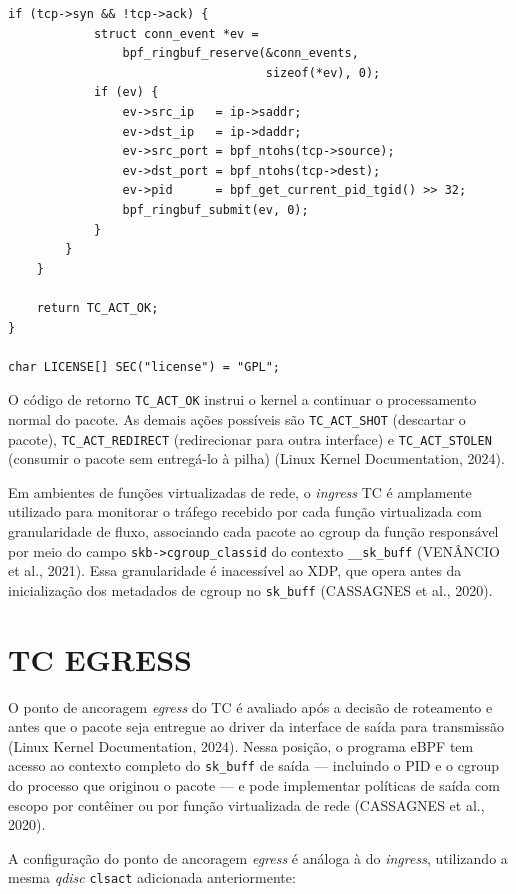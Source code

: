 \begin{lstlisting}[caption={Programa TC ingress que monitora bytes e novas conexões TCP.}, label=lst:tc-ingress-prog]
        if (tcp->syn && !tcp->ack) {
            struct conn_event *ev =
                bpf_ringbuf_reserve(&conn_events,
                                    sizeof(*ev), 0);
            if (ev) {
                ev->src_ip   = ip->saddr;
                ev->dst_ip   = ip->daddr;
                ev->src_port = bpf_ntohs(tcp->source);
                ev->dst_port = bpf_ntohs(tcp->dest);
                ev->pid      = bpf_get_current_pid_tgid() >> 32;
                bpf_ringbuf_submit(ev, 0);
            }
        }
    }

    return TC_ACT_OK;
}

char LICENSE[] SEC("license") = "GPL";
\end{lstlisting}

O código de retorno \texttt{TC\_ACT\_OK} instrui o kernel a continuar o processamento
normal do pacote. As demais ações possíveis são \texttt{TC\_ACT\_SHOT} (descartar o
pacote), \texttt{TC\_ACT\_REDIRECT} (redirecionar para outra interface) e
\texttt{TC\_ACT\_STOLEN} (consumir o pacote sem entregá-lo à pilha) (Linux Kernel
Documentation, 2024).

Em ambientes de funções virtualizadas de rede, o \textit{ingress} TC é amplamente
utilizado para monitorar o tráfego recebido por cada função virtualizada com granularidade
de fluxo, associando cada pacote ao cgroup da função responsável por meio do campo
\texttt{skb->cgroup\_classid} do contexto \texttt{\_\_sk\_buff} (VENÂNCIO et al., 2021).
Essa granularidade é inacessível ao XDP, que opera antes da inicialização dos metadados
de cgroup no \texttt{sk\_buff} (CASSAGNES et al., 2020).

\section{TC EGRESS}

O ponto de ancoragem \textit{egress} do TC é avaliado após a decisão de roteamento
e antes que o pacote seja entregue ao driver da interface de saída para transmissão
(Linux Kernel Documentation, 2024). Nessa posição, o programa eBPF tem acesso ao
contexto completo do \texttt{sk\_buff} de saída — incluindo o PID e o cgroup do processo
que originou o pacote — e pode implementar políticas de saída com escopo por contêiner
ou por função virtualizada de rede (CASSAGNES et al., 2020).

A configuração do ponto de ancoragem \textit{egress} é análoga à do \textit{ingress},
utilizando a mesma \textit{qdisc} \texttt{clsact} adicionada anteriormente:


